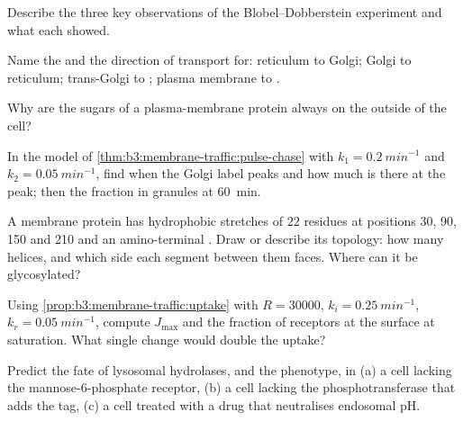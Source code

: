 \begin{exercise}[$\star$]\label{exo:b3:membrane-traffic:2}
Describe the three key observations of the Blobel--Dobberstein
experiment and what each showed.
\end{exercise}

\begin{exercise}[$\star$]\label{exo:b3:membrane-traffic:3}
Name the  and the direction of transport for: reticulum to Golgi;
Golgi to reticulum; trans-Golgi to ; plasma membrane to
.
\end{exercise}

\begin{exercise}[$\star$]\label{exo:b3:membrane-traffic:4}
Why are the sugars of a plasma-membrane protein always on the outside
of the cell?
\end{exercise}

\begin{exercise}[$\star\star$]\label{exo:b3:membrane-traffic:5}
In the model of \cref{thm:b3:membrane-traffic:pulse-chase} with $k_{1}
= \qty{0.2}{min^{-1}}$ and $k_{2} = \qty{0.05}{min^{-1}}$, find when
the Golgi label peaks and how much is there at the peak; then the
fraction in granules at \qty{60}{min}.
\end{exercise}

\begin{exercise}[$\star\star$]\label{exo:b3:membrane-traffic:6}
A membrane protein has hydrophobic stretches of $22$ residues at
positions 30, 90, 150 and 210 and an amino-terminal .
Draw or describe its topology: how many helices, and which side each
segment between them faces. Where can it be glycosylated?
\end{exercise}

\begin{exercise}[$\star\star$]\label{exo:b3:membrane-traffic:7}
Using \cref{prop:b3:membrane-traffic:uptake} with $R = \num{30000}$,
$k_{i} = \qty{0.25}{min^{-1}}$, $k_{r} = \qty{0.05}{min^{-1}}$, compute
$J_{\max}$ and the fraction of receptors at the surface at saturation.
What single change would double the uptake?
\end{exercise}

\begin{exercise}[$\star\star$]\label{exo:b3:membrane-traffic:8}
Predict the fate of lysosomal hydrolases, and the phenotype, in (a)
a cell lacking the mannose-6-phosphate receptor, (b) a cell lacking
the phosphotransferase that adds the tag, (c) a cell treated with a
drug that neutralises endosomal pH.
\end{exercise}

